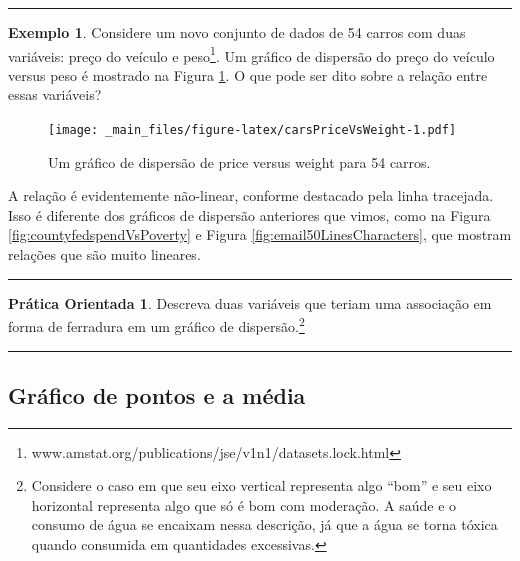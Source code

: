 \documentclass[
]{book}
\theoremstyle{definition}
\theoremstyle{definition}
\newtheorem{example}{Exemplo}[chapter]
\theoremstyle{definition}
\newtheorem{exercise}{Prática Orientada}[chapter]
\theoremstyle{definition}
\theoremstyle{remark}
\begin{document}
\begin{center}\rule{0.5\linewidth}{0.5pt}\end{center}

\begin{example}
\protect\hypertarget{exm:unnamed-chunk-16}{}{\label{exm:unnamed-chunk-16} }Considere um novo conjunto de dados de 54 carros com duas variáveis: preço do veículo e peso\footnote{www.amstat.org/publications/jse/v1n1/datasets.lock.html}. Um gráfico de dispersão do preço do veículo versus peso é mostrado na Figura \ref{fig:carsPriceVsWeight}. O que pode ser dito sobre a relação entre essas variáveis?
\end{example}

\begin{figure}
\centering
\texttt{[image: \_main\_files/figure-latex/carsPriceVsWeight-1.pdf]}
\caption{\label{fig:carsPriceVsWeight}Um gráfico de dispersão de price versus weight para 54 carros.}
\end{figure}

A relação é evidentemente não-linear, conforme destacado pela linha tracejada. Isso é diferente dos gráficos de dispersão anteriores que vimos, como na Figura \ref{fig:countyfedspendVsPoverty} e Figura \ref{fig:email50LinesCharacters}, que mostram relações que são muito lineares.

\begin{center}\rule{0.5\linewidth}{0.5pt}\end{center}

\begin{exercise}
\protect\hypertarget{exr:unnamed-chunk-17}{}{\label{exr:unnamed-chunk-17} }Descreva duas variáveis que teriam uma associação em forma de ferradura em um gráfico de dispersão.\footnote{Considere o caso em que seu eixo vertical representa algo ``bom'' e seu eixo horizontal representa algo que só é bom com moderação. A saúde e o consumo de água se encaixam nessa descrição, já que a água se torna tóxica quando consumida em quantidades excessivas.}
\end{exercise}

\begin{center}\rule{0.5\linewidth}{0.5pt}\end{center}

\hypertarget{dotPlot}{%
\subsection{Gráfico de pontos e a média}\label{dotPlot}}
\end{document}
